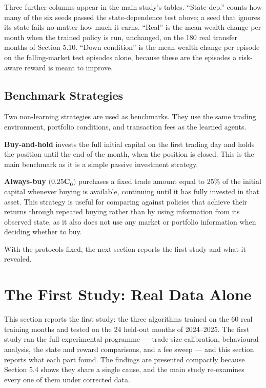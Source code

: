 Three further columns appear in the main study's tables.
``State-dep.'' counts how many of the six seeds passed the
state-dependence test above; a seed that ignores its state fails no
matter how much it earns. ``Real'' is the mean wealth change per month
when the trained policy is run, unchanged, on the 180 real transfer
months of Section 5.10. ``Down condition'' is the mean wealth change per
episode on the falling-market test episodes alone, because these are the
episodes a risk-aware reward is meant to improve.

\subsection{Benchmark Strategies}

Two non-learning strategies are used as benchmarks. They use the same
trading environment, portfolio conditions, and transaction fees as the
learned agents.

\textbf{Buy-and-hold} invests the full initial capital on the first
trading day and holds the position until the end of the month, when the
position is closed. This is the main benchmark as it is a simple passive
investment strategy.

\textbf{Always-buy} \(\mathbf{(0.25}\mathbf{C}_{\mathbf{0}}\mathbf{)}\)
purchases a fixed trade amount equal to 25\% of the initial capital
whenever buying is available, continuing until it has fully invested in
that asset. This strategy is useful for comparing against policies that
achieve their returns through repeated buying rather than by using
information from its observed state, as it also does not use any market
or portfolio information when deciding whether to buy.

With the protocols fixed, the next section reports the first study and
what it revealed.

\section{The First Study: Real Data Alone}

This section reports the first study: the three algorithms trained on
the 60 real training months and tested on the 24 held-out months of
2024--2025. The first study ran the full experimental programme --- trade-size
calibration, behavioural analysis, the state and reward comparisons, and
a fee sweep --- and this section reports what each part found. The
findings are presented compactly because Section 5.4 shows they share a
single cause, and the main study re-examines every one of them under
corrected data.

